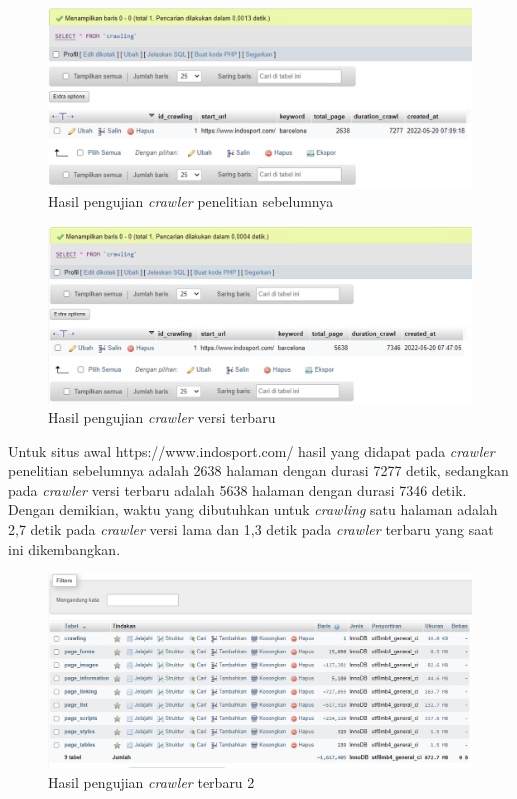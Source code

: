 \begin{enumerate}
	\begin{figure}[H]
	\centering
	\includegraphics[keepaspectratio, width=13cm]{gambar/sprint1_testing2_old}
	\caption{Hasil pengujian \textit{crawler} penelitian sebelumnya}
	\label{gambar:sprint1_testing2_old}
	\end{figure}
	
	\begin{figure}[H]
	\centering
	\includegraphics[keepaspectratio, width=13cm]{gambar/sprint1_testing2}
	\caption{Hasil pengujian \textit{crawler} versi terbaru}
	\label{gambar:sprint1_testing2}
	\end{figure}
	
	Untuk situs awal https://www.indosport.com/ hasil yang didapat pada \textit{crawler} penelitian sebelumnya adalah 2638 halaman dengan durasi 7277 detik, sedangkan pada \textit{crawler} versi terbaru adalah 5638 halaman dengan durasi 7346 detik. Dengan demikian, waktu yang dibutuhkan untuk \textit{crawling} satu halaman adalah 2,7 detik pada \textit{crawler} versi lama dan 1,3 detik pada \textit{crawler} terbaru yang saat ini dikembangkan.
	
	\begin{figure}[H]
	\centering
	\includegraphics[keepaspectratio, width=13cm]{gambar/sprint1_testing3}
	\caption{Hasil pengujian \textit{crawler} terbaru 2}
	\label{gambar:sprint1_testing3}
	\end{figure}
	

\end{enumerate}
